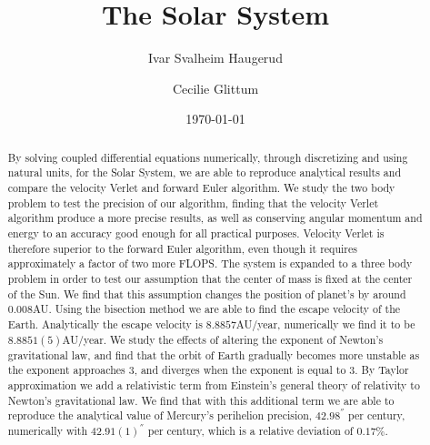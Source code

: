 \documentclass[%
 reprint,
nofootinbib,
aps,
]{revtex4-1}
\begin{document}

\title{The Solar System}%


\author{Ivar Svalheim Haugerud}
\author{Cecilie Glittum}

%


\date{\today}%

\begin{abstract}
By solving coupled differential equations numerically, through discretizing and using natural units, for the Solar System, we are able to reproduce analytical results and compare the velocity Verlet and forward Euler algorithm.
We study the two body problem to test the precision of our algorithm, finding that the velocity Verlet algorithm produce a more precise results, as well as conserving angular momentum and energy to an accuracy good enough for all practical purposes. Velocity Verlet is therefore superior to the forward Euler algorithm, even though it requires approximately a factor of two more FLOPS. The system is expanded to a three body problem in order to test our assumption that the center of mass is fixed at the center of the Sun. We find that this assumption changes the position of planet's by around $0.008$AU. Using the bisection method we are able to find the escape velocity of the Earth. Analytically the escape velocity is $8.8857$AU/year, numerically we find it to be $8.8851(5)$AU/year. We study the effects of altering the exponent of Newton's gravitational law, and find that the orbit of Earth gradually becomes more unstable as the exponent approaches $3$, and diverges when the exponent is equal to $3$. By Taylor approximation we add a relativistic term from Einstein's general theory of relativity to Newton's gravitational law. We find that with this additional term we are able to reproduce the analytical value of Mercury's perihelion precision, $42.98^{''}$ per century, numerically with $42.91(1)^{''}$ per century, which is a relative deviation of $0.17\%$.
\end{abstract}
\maketitle
\end{document}
